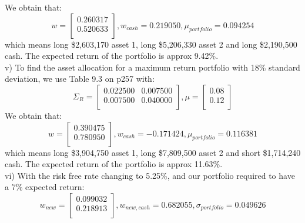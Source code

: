 \documentclass{article}
\begin{document}
We obtain that:
\begin{equation*}
w = %
\begin{bmatrix}{}
 0.260317 \\ 
  0.520633 \\ 
  \end{bmatrix},
w_{cash} = 0.219050,
\mu_{portfolio} = 0.094254
\end{equation*}
which means long \$2,603,170 asset 1, long \$5,206,330 asset 2 and long \$2,190,500 cash. The expected return of the portfolio is approx 9.42\%.
\vspace{5mm} \\
v) To find the asset allocation for a maximum return portfolio with 18\% standard deviation, we use Table 9.3 on p257 with:
\begin{equation*}
\Sigma_{R}=%
\begin{bmatrix}{}
 0.022500 & 0.007500 \\ 
  0.007500 & 0.040000 \\ 
  \end{bmatrix},
 \mu = \begin{bmatrix}{} 
0.08 \\
0.12 \\
  \end{bmatrix}
\end{equation*}
We obtain that:
\begin{equation*}
w = %
\begin{bmatrix}{}
 0.390475 \\ 
  0.780950 \\ 
  \end{bmatrix},
w_{cash} = -0.171424,
\mu_{portfolio} = 0.116381
\end{equation*}
which means long \$3,904,750 asset 1, long \$7,809,500 asset 2 and short \$1,714,240 cash. The expected return of the portfolio is approx 11.63\%.
\vspace{5mm} \\
vi) With the risk free rate changing to 5.25\%, and our portfolio required to have a 7\% expected return: 
\begin{equation*}
w_{new} = %
\begin{bmatrix}{}
 0.099032 \\ 
  0.218913 \\ 
  \end{bmatrix},
w_{new,cash} = 0.682055,
\sigma_{portfolio} = 0.049626
\end{equation*}
\end{document}
